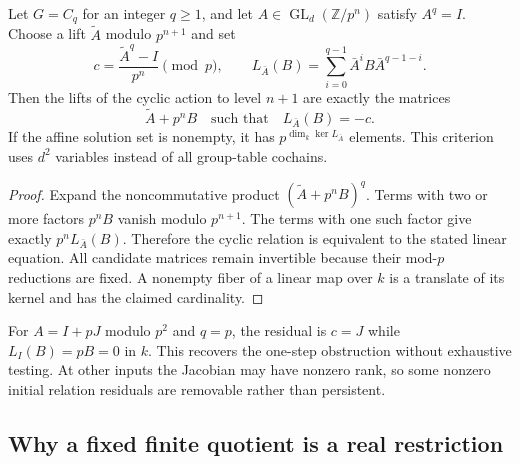\begin{proposition}\label{prop:cyclic-jacobian}
Let $G=C_q$ for an integer $q\geq1$, and let $A\in\operatorname{GL}_d(\mathbb Z/p^n)$ satisfy $A^q=I$. Choose a lift $\widetilde A$ modulo $p^{n+1}$ and set
\[
 c=\frac{\widetilde A^q-I}{p^n}\pmod p,
 \qquad L_{\bar A}(B)=\sum_{i=0}^{q-1}\bar A^iB\bar A^{q-1-i}.
\]
Then the lifts of the cyclic action to level $n+1$ are exactly the matrices
\[
 \widetilde A+p^nB\quad\text{such that}\quad L_{\bar A}(B)=-c.
\]
If the affine solution set is nonempty, it has $p^{\dim_k\ker L_{\bar A}}$ elements. This criterion uses $d^2$ variables instead of all group-table cochains.
\end{proposition}
\begin{proof}
Expand the noncommutative product $(\widetilde A+p^nB)^q$. Terms with two or more factors $p^nB$ vanish modulo $p^{n+1}$. The terms with one such factor give exactly $p^nL_{\bar A}(B)$. Therefore the cyclic relation is equivalent to the stated linear equation. All candidate matrices remain invertible because their mod-$p$ reductions are fixed. A nonempty fiber of a linear map over $k$ is a translate of its kernel and has the claimed cardinality.
\end{proof}

For $A=I+pJ$ modulo $p^2$ and $q=p$, the residual is $c=J$ while $L_I(B)=pB=0$ in $k$. This recovers the one-step obstruction without exhaustive testing. At other inputs the Jacobian may have nonzero rank, so some nonzero initial relation residuals are removable rather than persistent.

\subsection{Why a fixed finite quotient is a real restriction}

